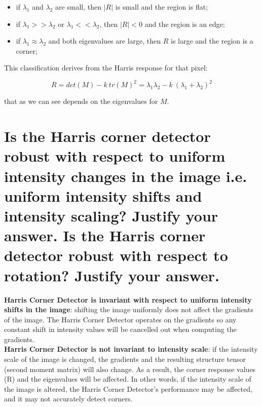 \documentclass{article}
\begin{document}
\begin{enumerate}[start=0]
    \begin{itemize}
        \item if $\lambda_1$ and $\lambda_2$ are small, then $|R|$ is small and the region is flat;
        \item if $\lambda_1 >> \lambda_2$ or $\lambda_1 <<\lambda_2$, then $|R| < 0$ and the region is an edge;
        \item if $\lambda_1 \approx \lambda_2$ and both eigenvalues are large, then $R$ is large and the region is a corner;
    \end{itemize}
    This classification derives from the Harris response for that pixel:
    \begin{center}
            \begin{equation*}
                R = det(M) - k\ tr(M)^2 = \lambda_1 \lambda_2 - k\ (\lambda_1 + \lambda_2)^2
            \end{equation*}
    \end{center}
    that as we can see depends on the eigenvalues for $M$.
\end{enumerate}

\newpage

\section*{Is the Harris corner detector robust with respect to uniform intensity changes in the image i.e. uniform intensity shifts and intensity scaling? Justify your answer. Is the Harris corner detector robust with respect to rotation? Justify your answer.} 

\textbf{Harris Corner Detector is invariant with respect to uniform intensity shifts in the image}: shifting the image uniformly does not affect the gradients of the image. The Harris Corner Detector operates on the gradients so any constant shift in intensity values will be cancelled out when computing the gradients. \\

\textbf{Harris Corner Detector is not invariant to intensity scale}: if the intensity scale of the image is changed, the gradients and the resulting structure tensor (second moment matrix) will also change. As a result, the corner response values (R) and the eigenvalues will be affected. In other words, if the intensity scale of the image is altered, the Harris Corner Detector's performance may be affected, and it may not accurately detect corners. \\
\end{document}

